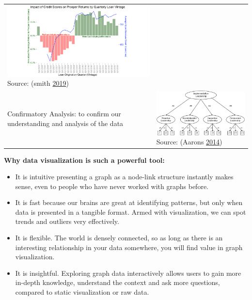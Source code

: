 \documentclass[]{book}
\providecommand{\tightlist}{%
  \setlength{\itemsep}{0pt}\setlength{\parskip}{0pt}}
\begin{document}
\begin{longtable}[]{@{}ll@{}}
\begin{minipage}[t]{0.47\columnwidth}
\includegraphics{images/Exploratory.png} Source: (smith \protect\hyperlink{ref-david_2019}{2019})\strut
\end{minipage}\tabularnewline
\begin{minipage}[t]{0.47\columnwidth}\raggedright
Confirmatory Analysis: to confirm our understanding and analysis of the data\strut
\end{minipage} & \begin{minipage}[t]{0.47\columnwidth}\raggedright
\includegraphics{images/confirmatory.png} Source: (Aarons \protect\hyperlink{ref-aarons_2014}{2014})\strut
\end{minipage}\tabularnewline
\bottomrule
\end{longtable}

\textbf{Why data visualization is such a powerful tool:}

\begin{itemize}
\tightlist
\item
  It is intuitive presenting a graph as a node-link structure instantly makes sense, even to people who have never worked with graphs before.
\item
  It is fast because our brains are great at identifying patterns, but only when data is presented in a tangible format. Armed with visualization, we can spot trends and outliers very effectively.
\item
  It is flexible. The world is densely connected, so as long as there is an interesting relationship in your data somewhere, you will find value in graph visualization.
\item
  It is insightful. Exploring graph data interactively allows users to gain more in-depth knowledge, understand the context and ask more questions, compared to static visualization or raw data.
\end{itemize}
\end{document}
